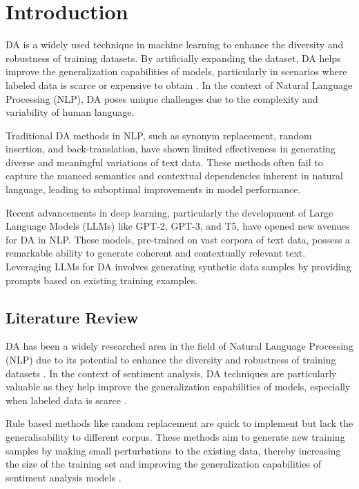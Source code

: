 \documentclass[10pt]{extarticle}
\begin{document}
\section{Introduction}

DA is a widely used technique in machine learning to enhance the diversity and
robustness of training datasets. By artificially expanding the dataset, DA
helps improve the generalization capabilities of models, particularly in
scenarios where labeled data is scarce or expensive to obtain
\cite{DBLP:journals/corr/abs-2105-03075}. In the context of Natural Language
Processing (NLP), DA poses unique challenges due to the complexity and
variability of human language.

Traditional DA methods in NLP, such as synonym replacement, random insertion,
and back-translation, have shown limited effectiveness in generating diverse
and meaningful variations of text data. These methods often fail to capture the
nuanced semantics and contextual dependencies inherent in natural language,
leading to suboptimal improvements in model performance.

Recent advancements in deep learning, particularly the development of Large
Language Models (LLMs) like GPT-2, GPT-3, and T5, have opened new avenues for
DA in NLP. These models, pre-trained on vast corpora of text data, possess a
remarkable ability to generate coherent and contextually relevant text.
Leveraging LLMs for DA involves generating synthetic data samples by providing
prompts based on existing training examples.

\subsection{Literature Review}

DA has been a widely researched area in the field of Natural Language
Processing (NLP) due to its potential to enhance the diversity and robustness
of training datasets \cite{DBLP:journals/corr/abs-2105-03075}. In the context
of sentiment analysis, DA techniques are particularly valuable as they help
improve the generalization capabilities of models, especially when labeled data
is scarce \cite{li-specia-2019-improving}.

Rule based methods like random replacement are quick to implement but lack the
generalisability to different corpus. These methods aim to generate new
training samples by making small perturbations to the existing data, thereby
increasing the size of the training set and improving the generalization
capabilities of sentiment analysis models \cite{wei-zou-2019-eda}.
\end{document}

